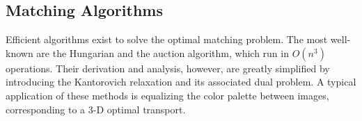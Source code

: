 \subsection{Matching Algorithms}

Efficient algorithms exist to solve the optimal matching problem. The most well-known are the Hungarian and the auction algorithm, which run in $O(n^3)$ operations. Their derivation and analysis, however, are greatly simplified by introducing the Kantorovich relaxation and its associated dual problem.
%
A typical application of these methods is equalizing the color palette between images, corresponding to a 3-D optimal transport.
